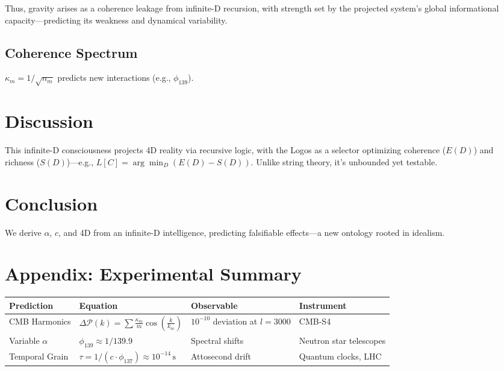 \documentclass[12pt]{article}
\begin{document}
Thus, gravity arises as a coherence leakage from infinite-D recursion, with strength set by the projected system’s global informational capacity—predicting its weakness and dynamical variability.

\subsection{Coherence Spectrum}
\(\kappa_m = 1/\sqrt{n_m}\) predicts new interactions (e.g., \(\phi_{139}\)).

\section{Discussion}

This infinite-D consciousness projects 4D reality via recursive logic, with the Logos as a selector optimizing coherence (\(E(D)\)) and richness (\(S(D)\))—e.g., \(L[C] = \arg\min_D (E(D) - S(D))\). Unlike string theory, it’s unbounded yet testable.

\section{Conclusion}

We derive \(\alpha\), \(c\), and 4D from an infinite-D intelligence, predicting falsifiable effects—a new ontology rooted in idealism.

\section*{Appendix: Experimental Summary}
\begin{tabularx}{\textwidth}{|l|X|l|l|}
\hline
\textbf{Prediction} & \textbf{Equation} & \textbf{Observable} & \textbf{Instrument} \\
\hline
CMB Harmonics & \(\Delta \mathcal{P}(k) = \sum \frac{\kappa_m}{m} \cos\left(\frac{k}{k_m}\right)\) & \(10^{-10}\) deviation at \(l = 3000\) & CMB-S4 \\
\hline
Variable \(\alpha\) & \(\phi_{139} \approx 1/139.9\) & Spectral shifts & Neutron star telescopes \\
\hline
Temporal Grain & \(\tau = 1/(c \cdot \phi_{137}) \approx 10^{-14} \, \text{s}\) & Attosecond drift & Quantum clocks, LHC \\
\hline
\end{tabularx}
\end{document}
